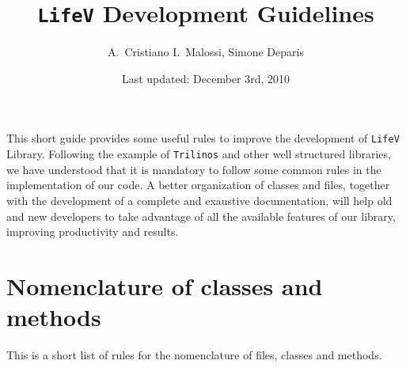 \documentclass[10p]{article}
\title{\texttt{LifeV} Development Guidelines}
\author{A.\ Cristiano I.\ Malossi, Simone Deparis}
\date{Last updated: December 3rd, 2010}
\begin{document}
\maketitle

This short guide provides some useful rules to improve the development of \texttt{LifeV} Library. Following the example of \texttt{Trilinos} and other well structured libraries, we have understood that it is mandatory to follow some common rules in the implementation of our code. A better organization of classes and files, together with the development of a complete and exaustive documentation, will help old and new developers to take advantage of all the available features of our library, improving productivity and results.

\section{Nomenclature of classes and methods}
This is a short list of rules for the nomenclature of files, classes and methods.
\end{document}
